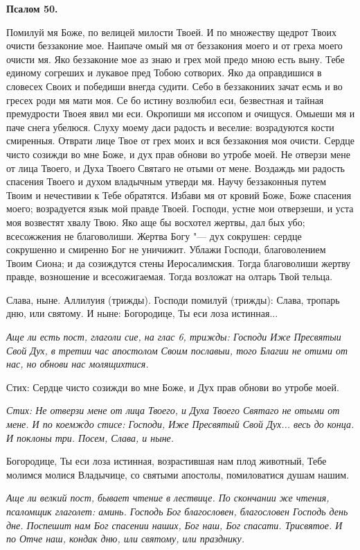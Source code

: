 \medskip


\bfseries Псалом 50.\normalfont{}


Помилуй мя Боже, по велицей милости Твоей. И по множеству щедрот Твоих очисти беззаконие мое. Наипаче омый мя от беззакония моего и от греха моего очисти мя. Яко беззаконие мое аз знаю и грех мой предо мною есть выну. Тебе единому согреших и лукавое пред Тобою сотворих. Яко да оправдишися в словесех Своих и победиши внегда судити. Себо в беззакониих зачат есмь и во гресех роди мя мати моя. Се бо истину возлюбил еси, безвестная и тайная премудрости Твоея явил ми еси. Окропиши мя иссопом и очищуся. Омыеши мя и паче снега убелюся. Слуху моему даси радость и веселие: возрадуются кости смиренныя. Отврати лице Твое от грех моих и вся беззакония моя очисти. Сердце чисто созижди во мне Боже, и дух прав обнови во утробе моей. Не отверзи мене от лица Твоего, и Духа Твоего Святаго не отыми от мене. Воздаждь ми радость спасения Твоего и духом владычным утверди мя. Научу беззаконныя путем Твоим и нечестивии к Тебе обратятся. Избави мя от кровий Боже, Боже спасения моего; возрадуется язык мой правде Твоей. Господи, устне мои отверзеши, и уста моя возвестят хвалу Твою. Яко аще бы восхотел жертвы, дал бых убо; всесожжения не благоволиши. Жертва Богу "--- дух сокрушен: сердце сокрушенно и смиренно Бог не уничижит. Ублажи Господи, благоволением Твоим Сиона; и да созиждутся стены Иеросалимския. Тогда благоволиши жертву правде, возношение и всесожигаемая. Тогда возложат на олтарь Твой тельца.

Слава, ныне. Аллилуия (трижды). Господи помилуй (трижды): Слава, тропарь дню, или святому. И ныне: Богородице, Ты еси лоза истинная...


\itshape Аще ли есть пост, глаголи сие, на глас 6, трижды:\normalfont{} Господи Иже Пресвятыи Свой Дух, в третии час апостолом Своим пославыи, того Благии не отими от нас, но обнови нас молящихтися.

Стих: Сердце чисто созижди во мне Боже, и Дух прав обнови во утробе моей.


\itshape Стих:\normalfont{} Не отверзи мене от лица Твоего, и Духа Твоего Святаго не отыми от мене. И по коемждо стисе: Господи, Иже Пресвятый Свой Дух... весь до конца. И поклоны три. Посем, Слава, и ныне. 

Богородице, Ты еси лоза истинная, возрастившая нам плод животный, Тебе молимся молися Владычице, со святыми апостолы, помиловатися душам нашим.


\itshape Аще ли велкий пост, бывает чтение в лествице.\normalfont{} По скончании же чтения, псаломщик глаголет: аминь. Господь Бог благословен, благословен Господь день дне. Поспешит нам Бог спасении наших, Бог наш, Бог спасати. Трисвятое. И по Отче наш, кондак дню, или святому, или празднику.


